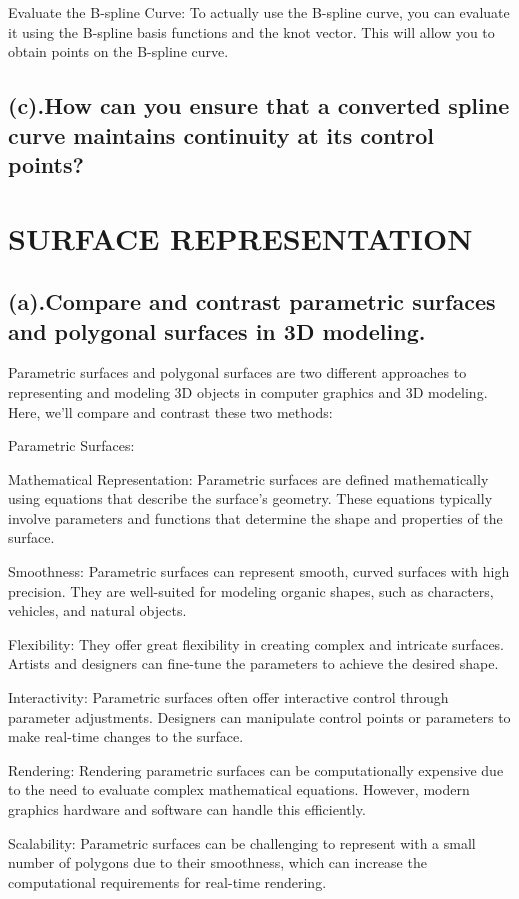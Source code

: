 \documentclass{article}
\begin{document}
\begin{itemize}
Evaluate the B-spline Curve:
To actually use the B-spline curve, you can evaluate it using the B-spline basis functions and the knot vector. This will allow you to obtain points on the B-spline curve.
\subsection{(c).How can you ensure that a converted spline curve maintains continuity at its control points?}
\section{SURFACE REPRESENTATION}
\subsection{(a).Compare and contrast parametric surfaces and polygonal surfaces in 3D modeling.}
Parametric surfaces and polygonal surfaces are two different approaches to representing and modeling 3D objects in computer graphics and 3D modeling. Here, we'll compare and contrast these two methods:

Parametric Surfaces:

Mathematical Representation: Parametric surfaces are defined mathematically using equations that describe the surface's geometry. These equations typically involve parameters and functions that determine the shape and properties of the surface.

Smoothness: Parametric surfaces can represent smooth, curved surfaces with high precision. They are well-suited for modeling organic shapes, such as characters, vehicles, and natural objects.

Flexibility: They offer great flexibility in creating complex and intricate surfaces. Artists and designers can fine-tune the parameters to achieve the desired shape.

Interactivity: Parametric surfaces often offer interactive control through parameter adjustments. Designers can manipulate control points or parameters to make real-time changes to the surface.

Rendering: Rendering parametric surfaces can be computationally expensive due to the need to evaluate complex mathematical equations. However, modern graphics hardware and software can handle this efficiently.

Scalability: Parametric surfaces can be challenging to represent with a small number of polygons due to their smoothness, which can increase the computational requirements for real-time rendering.


\end{itemize}
\end{document}
